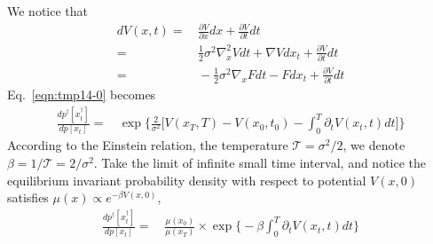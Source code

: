 \documentclass[aps, pre, preprint,unsortedaddress,a4paper,onecolumn]{revtex4}
\begin{document}
We notice that
\begin{align}\nonumber
  dV(x, t) = &\, \frac{\partial V}{\partial x} dx + \frac{\partial V}{\partial t} dt\\\nonumber
  =&\,
  \frac12 \sigma^2 \nabla^2_x V dt +  \nabla V dx_t + \frac{\partial V}{\partial t} dt \\
  =&\,
  -\frac12 \sigma^2 \nabla_x F dt -  F dx_t + \frac{\partial V}{\partial t} dt
\end{align}
Eq.~\eqref{eqn:tmp14-0} becomes
\begin{align}
  \frac{  dp^\dagger[x^\dagger_t] }{ dp[x_t]}
  =&\,
  \exp\bigg\{
  \frac2{\sigma^2}\bigg[
  V(x_T,T) - V(x_0,t_0) - \int_0^T\partial_tV(x_t,t)dt
  \bigg]
  \bigg\}
\end{align}
According to the  Einstein relation, the temperature $\mathcal T = \sigma^2/2$, we denote $\beta = 1/{\mathcal T} = 2/\sigma^2$.
Take the limit of infinite small time interval, and notice the equilibrium
invariant probability density with respect to potential $V(x,0)$ satisfies $\mu(x) \propto e^{-\beta V(x,0)}$,
\begin{align}
  \frac{  dp^\dagger[x^\dagger_t] }{ dp[x_t]}
  =&\,
  \frac{\mu(x_0)}{\mu(x_T)}\times
  \exp\bigg\{
  - \beta\int_0^T\partial_tV(x_t,t)dt
  \bigg\}
\end{align}
\end{document}
